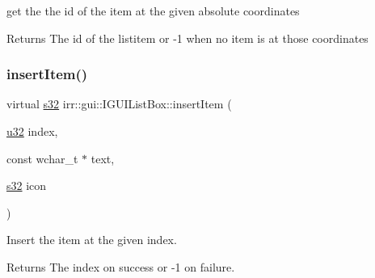 get the the id of the item at the given absolute coordinates 

\begin{DoxyReturn}{Returns}
The id of the listitem or -\/1 when no item is at those coordinates 
\end{DoxyReturn}
\mbox{\label{classirr_1_1gui_1_1IGUIListBox_a1da5cc33687efee5ff1e33ab9f0d5b26}} 
\subsubsection{\texorpdfstring{insert\+Item()}{insertItem()}\hspace{0.1cm}{\footnotesize\ttfamily [1/2]}}
{\footnotesize\ttfamily virtual \hyperlink{namespaceirr_ac66849b7a6ed16e30ebede579f9b47c6}{s32} irr\+::gui\+::\+I\+G\+U\+I\+List\+Box\+::insert\+Item (\begin{DoxyParamCaption}\item[{\hyperlink{namespaceirr_a0416a53257075833e7002efd0a18e804}{u32}}]{index,  }\item[{const wchar\+\_\+t $\ast$}]{text,  }\item[{\hyperlink{namespaceirr_ac66849b7a6ed16e30ebede579f9b47c6}{s32}}]{icon }\end{DoxyParamCaption})\hspace{0.3cm}{\ttfamily [pure virtual]}}



Insert the item at the given index. 

\begin{DoxyReturn}{Returns}
The index on success or -\/1 on failure. 
\end{DoxyReturn}
\mbox{\label{classirr_1_1gui_1_1IGUIListBox_a1da5cc33687efee5ff1e33ab9f0d5b26}} 
